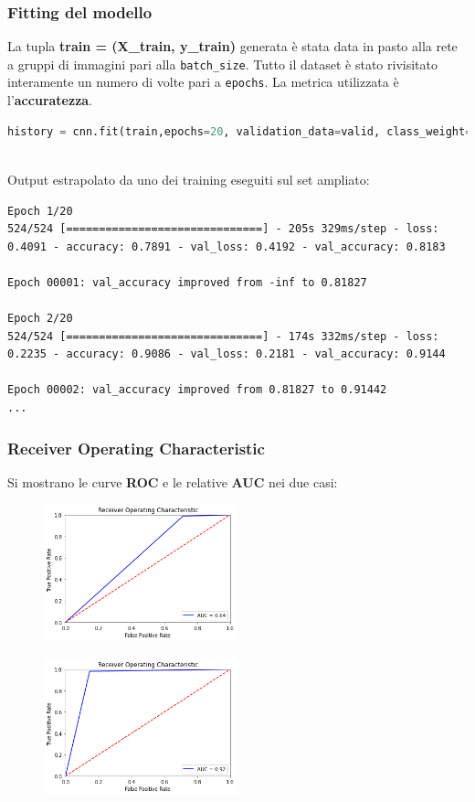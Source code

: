 \documentclass{beamer}
\begin{document}
\begin{frame}[fragile]
	\frametitle{Fitting del modello}
	La tupla \textbf{train = (X\_train, y\_train)} generata è stata data in pasto alla rete
	 a gruppi di immagini pari alla \lstinline[language = Python]{batch_size}.
	Tutto il dataset è stato rivisitato interamente un numero di volte pari a \lstinline[language = Python]{epochs}.
	La metrica utilizzata è l'\textbf{accuratezza}. %
	\begin{lstlisting}[basicstyle=\tiny, language=Python, numbers = none]
		history = cnn.fit(train,epochs=20, validation_data=valid, class_weight=cw, callbacks=callbacks_list)
		
	\end{lstlisting}
Output estrapolato da uno dei training eseguiti sul set ampliato:
\smallskip
\begin{lstlisting}[basicstyle=\tiny, numbers = none]
Epoch 1/20
524/524 [==============================] - 205s 329ms/step - loss: 0.4091 - accuracy: 0.7891 - val_loss: 0.4192 - val_accuracy: 0.8183

Epoch 00001: val_accuracy improved from -inf to 0.81827

Epoch 2/20
524/524 [==============================] - 174s 332ms/step - loss: 0.2235 - accuracy: 0.9086 - val_loss: 0.2181 - val_accuracy: 0.9144

Epoch 00002: val_accuracy improved from 0.81827 to 0.91442
...
\end{lstlisting}
\end{frame}


\begin{frame}
	\frametitle{Receiver Operating Characteristic}
	Si mostrano le curve \textbf{ROC} e le relative \textbf{AUC} nei due casi:
	\begin{figure}
		\includegraphics[width=0.5\textwidth]{roc-pneumonia-no-aug.png}
	\end{figure}

\begin{figure}
	\includegraphics[width=0.5\textwidth]{roc-pneumonia-aug.png}
\end{figure}	
\end{frame}
\end{document}
